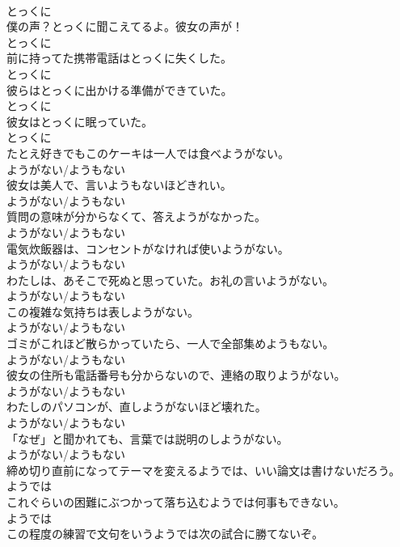 \documentclass[8pt]{extreport}
\begin{document}
\begin{CJK}{UTF8}{min}
\\	とっくに
\\	僕の声？とっくに聞こえてるよ。彼女の声が！	
\\	とっくに
\\	前に持ってた携帯電話はとっくに失くした。	
\\	とっくに
\\	彼らはとっくに出かける準備ができていた。	
\\	とっくに
\\	彼女はとっくに眠っていた。	
\\	とっくに
\\	たとえ好きでもこのケーキは一人では食べようがない。	
\\	ようがない/ようもない
\\	彼女は美人で、言いようもないほどきれい。	
\\	ようがない/ようもない
\\	質問の意味が分からなくて、答えようがなかった。	
\\	ようがない/ようもない
\\	電気炊飯器は、コンセントがなければ使いようがない。	
\\	ようがない/ようもない
\\	わたしは、あそこで死ぬと思っていた。お礼の言いようがない。	
\\	ようがない/ようもない
\\	この複雑な気持ちは表しようがない。	
\\	ようがない/ようもない
\\	ゴミがこれほど散らかっていたら、一人で全部集めようもない。	
\\	ようがない/ようもない
\\	彼女の住所も電話番号も分からないので、連絡の取りようがない。	
\\	ようがない/ようもない
\\	わたしのパソコンが、直しようがないほど壊れた。	
\\	ようがない/ようもない
\\	「なぜ」と聞かれても、言葉では説明のしようがない。	
\\	ようがない/ようもない
\\	締め切り直前になってテーマを変えるようでは、いい論文は書けないだろう。	
\\	ようでは
\\	これぐらいの困難にぶつかって落ち込むようでは何事もできない。	
\\	ようでは
\\	この程度の練習で文句をいうようでは次の試合に勝てないぞ。	

\end{CJK}
\end{document}
